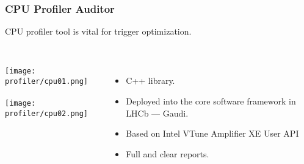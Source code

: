 \begin{frame}
\frametitle{CPU Profiler Auditor}
CPU profiler tool is vital for trigger optimization.\\~\\
\begin{columns}[c]
\texttt{[image: profiler/cpu01.png]}\\~\\
\texttt{[image: profiler/cpu02.png]}
\begin{itemize}
    \item C++ library.
    \item Deployed into the core software framework in LHCb --- Gaudi.
    \item Based on Intel\textsuperscript{\textregistered} VTune\texttrademark
    Amplifier XE User API
    \item Full and clear reports.
\end{itemize}
\end{columns}
\end{frame}